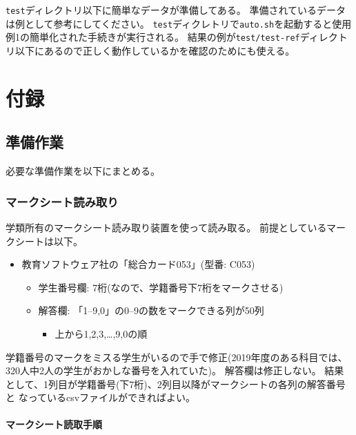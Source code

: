 \texttt{test}ディレクトリ以下に簡単なデータが準備してある。
準備されているデータは例として参考にしてください。
\texttt{test}ディクレトリで\texttt{auto.sh}を起動すると使用例1の簡単化された手続きが実行される。
結果の例が\texttt{test\slash test-ref}ディレクトリ以下にあるので正しく動作しているかを確認のためにも使える。

\section{付録}
\label{付録}

\subsection{準備作業}
\label{準備作業}

必要な準備作業を以下にまとめる。

\subsubsection{マークシート読み取り}
\label{マークシート読み取り}

学類所有のマークシート読み取り装置を使って読み取る。
前提としているマークシートは以下。

\begin{itemize}
\item 教育ソフトウェア社の「総合カード053」(型番: C053)

\begin{itemize}
\item 学生番号欄: 7桁(なので、学籍番号下7桁をマークさせる)

\item 解答欄: 「1--9,0」の0--9の数をマークできる列が50列

\begin{itemize}
\item 上から1,2,3,{\ldots},9,0の順

\end{itemize}

\end{itemize}

\end{itemize}
学籍番号のマークをミスる学生がいるので手で修正(2019年度のある科目では、
320人中2人の学生がおかしな番号を入れていた)。
解答欄は修正しない。
結果として、1列目が学籍番号(下7桁)、2列目以降がマークシートの各列の解答番号と
なっているcsvファイルができればよい。

\paragraph{マークシート読取手順}
\label{マークシート読取手順}

